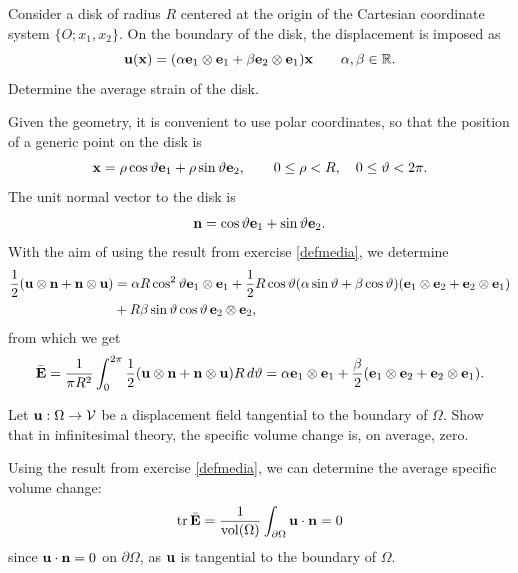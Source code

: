 \begin{exercise}
	\item Consider a disk of radius $R$ centered at the origin of the Cartesian coordinate system $\{O; x_1, x_2\}$. On the boundary of the disk, the displacement is imposed as
	\begin{equation}
		\mathbf{u}(\mathbf{x}) = (\alpha \mathbf{e}_1 \otimes \mathbf{e}_1 + \beta \mathbf{e}_2 \otimes \mathbf{e}_1) \mathbf{x} \qquad \alpha, \beta \in \mathbb{R}.
	\end{equation}
	Determine the average strain of the disk.
	\begin{svolgimento}
		Given the geometry, it is convenient to use polar coordinates, so that the position of a generic point on the disk is
		\begin{equation}
			\mathbf{x} = \rho \cos\vartheta \mathbf{e}_1 + \rho \sin\vartheta \mathbf{e}_2, \qquad 0 \leq \rho < R, \quad 0 \leq \vartheta < 2\pi.
		\end{equation}
		The unit normal vector to the disk is 
		\begin{equation}
			\mathbf{n} = \cos\vartheta \mathbf{e}_1 + \sin\vartheta \mathbf{e}_2.
		\end{equation}
		With the aim of using the result from exercise \ref{defmedia}, we determine
		\begin{equation}
			\begin{aligned}
				\frac12 (\mathbf{u} \otimes \mathbf{n} + \mathbf{n} \otimes \mathbf{u}) &= \alpha R \cos^2 \vartheta \mathbf{e}_1 \otimes \mathbf{e}_1 + \frac{1}{2} R \cos\vartheta (\alpha \sin\vartheta + \beta \cos\vartheta) (\mathbf{e}_1 \otimes \mathbf{e}_2 + \mathbf{e}_2 \otimes \mathbf{e}_1)\\
				&+ R \beta \sin\vartheta \cos\vartheta\, \mathbf{e}_2 \otimes \mathbf{e}_2,
			\end{aligned}
		\end{equation}
		from which we get
		\begin{equation}
			\bar{\mathbf{E}} = \frac{1}{\pi R^2} \int_0^{2\pi} \frac12 (\mathbf{u} \otimes \mathbf{n} + \mathbf{n} \otimes \mathbf{u}) R \, d\vartheta = \alpha \mathbf{e}_1 \otimes \mathbf{e}_1 + \frac \beta 2 (\mathbf{e}_1 \otimes \mathbf{e}_2 + \mathbf{e}_2 \otimes \mathbf{e}_1).
		\end{equation}
	\end{svolgimento}
\end{exercise}

\begin{exercise}
	Let  $\mathbf{u}: \Omega \to \mathcal{V}$ be a displacement field tangential to the boundary of $\Omega$. Show that in infinitesimal theory, the specific volume change is, on average, zero.
	\begin{svolgimento}
		Using the result from exercise \ref{defmedia}, we can determine the average specific volume change:
		\begin{equation}
			\operatorname{tr} \bar{\mathbf{E}} = \frac{1}{\operatorname{vol}(\Omega)} \int_{\partial{\Omega}} \mathbf{u} \cdot \mathbf{n} = 0
		\end{equation}
		since $\mathbf{u} \cdot \mathbf{n} = 0$ on $\partial{\Omega}$, as $\mathbf{u}$ is tangential to the boundary of $\Omega$.
	\end{svolgimento}
\end{exercise}


